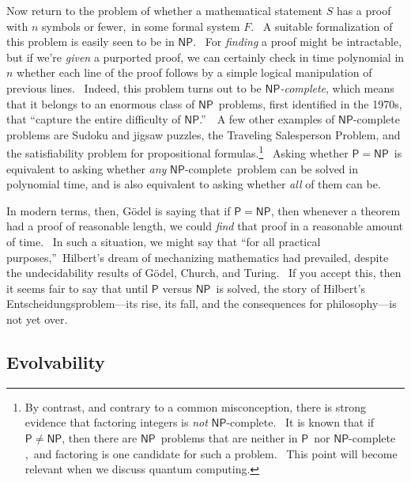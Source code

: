 \documentclass[12pt,onecolumn]{article}%
\begin{document}
Now return to the problem of whether a mathematical statement $S$ has a proof
with $n$ symbols or fewer,\ in some formal system $F$. \ A suitable
formalization of this problem is easily seen to be in $\mathsf{NP}$. \ For
\textit{finding} a proof might be intractable, but if we're \textit{given} a
purported proof, we can certainly check in time polynomial in $n$ whether each
line of the proof follows by a simple logical manipulation of previous lines.
\ Indeed, this problem turns out to be $\mathsf{NP}$\textit{-complete}, which
means that it belongs to an enormous class of $\mathsf{NP}$\ problems, first
identified in the 1970s, that \textquotedblleft capture the entire difficulty
of $\mathsf{NP}$.\textquotedblright\ \ A few other examples of $\mathsf{NP}%
$-complete problems are Sudoku and jigsaw puzzles, the Traveling Salesperson
Problem, and the satisfiability problem for propositional
formulas.\footnote{\label{FACTOR}By contrast, and contrary to a common
misconception, there is strong evidence that factoring integers is
\textit{not} $\mathsf{NP}$-complete. \ It is known that if $\mathsf{P}%
\neq\mathsf{NP}$, then there are $\mathsf{NP}$\ problems that are neither in
$\mathsf{P}$\ nor $\mathsf{NP}$-complete \cite{ladner},\ and factoring is one
candidate for such a problem. \ This point will become relevant when we
discuss quantum computing.} \ Asking whether $\mathsf{P}=\mathsf{NP}$\ is
equivalent to asking whether \textit{any} $\mathsf{NP}$-complete\ problem can
be solved in polynomial time, and is also equivalent to asking whether
\textit{all} of them can be.

In modern terms, then, G\"{o}del is saying that if $\mathsf{P}=\mathsf{NP}$,
then whenever a theorem had a proof of reasonable length, we could
\textit{find} that proof in a reasonable amount of time. \ In such a
situation, we might say that \textquotedblleft for all practical
purposes,\textquotedblright\ Hilbert's dream of mechanizing mathematics had
prevailed, despite the undecidability results of G\"{o}del, Church, and
Turing. \ If you accept this, then it seems fair to say that until
$\mathsf{P}$ versus $\mathsf{NP}$\ is solved, the story of Hilbert's
Entscheidungsproblem---its rise, its fall, and the consequences for
philosophy---is not yet over.

\subsection{Evolvability\label{EVOL}}
\end{document}
